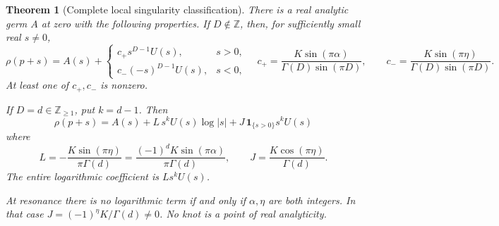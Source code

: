 \documentclass[11pt,a4paper]{article}
\newtheorem{theorem}{Theorem}[section]
\theoremstyle{definition}
\theoremstyle{remark}
\numberwithin{equation}{section}
\begin{document}
\begin{theorem}[Complete local singularity classification]\label{p9:thm:JR:local}
There is a real analytic germ \(A\) at zero with the following properties.
If \(D\notin\mathbb Z\), then, for sufficiently small real \(s\ne0\),
\begin{equation}\label{p9:eq:JR:noninteger}
 \rho(p+s)=A(s)+
 \begin{cases}
 c_+s^{D-1}U(s),&s>0,\\
 c_-(-s)^{D-1}U(s),&s<0,
 \end{cases}
 \quad
 c_+=\frac{K\sin(\pi\alpha)}{\Gamma(D)\sin(\pi D)},\qquad
 c_-=\frac{K\sin(\pi\eta)}{\Gamma(D)\sin(\pi D)}.
\end{equation}
At least one of \(c_+,c_-\) is nonzero.

If \(D=d\in\mathbb Z_{\ge1}\), put \(k=d-1\). Then
\begin{equation}\label{p9:eq:JR:integer}
 \boxed{\displaystyle
 \rho(p+s)=A(s)+L\,s^kU(s)\log|s|
                  +J\,\mathbf1_{\{s>0\}}s^kU(s)}
\end{equation}
where
\begin{equation}\label{p9:eq:JR:LJ}
 L=-\frac{K\sin(\pi\eta)}{\pi\Gamma(d)}
   =\frac{(-1)^dK\sin(\pi\alpha)}{\pi\Gamma(d)},\qquad
 J=\frac{K\cos(\pi\eta)}{\Gamma(d)}.
\end{equation}
The entire logarithmic coefficient is \(L s^kU(s)\).

At resonance there is no logarithmic term if and only if
\(\alpha,\eta\) are both integers. In that case
\(J=(-1)^\eta K/\Gamma(d)\ne0\). No knot is a point of real analyticity.
\end{theorem}
\end{document}
